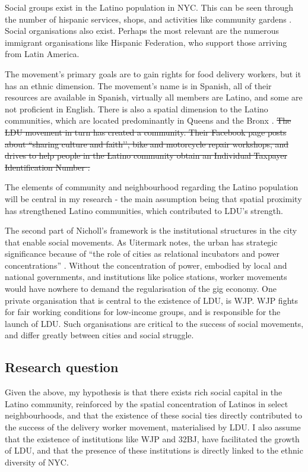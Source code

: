 \documentclass{article}[12pt]
\begin{document}
Social groups exist in the Latino population in NYC. This can be seen through the number of hispanic services, shops, and activities like community gardens \parencite{saldivar2004culturing}. Social organisations also exist. Perhaps the most relevant are the numerous immigrant organisations like Hispanic Federation, who support those arriving from Latin America. 

The movement’s primary goals are to gain rights for food delivery workers, but it has an ethnic dimension. The movement’s name is in Spanish, all of their resources are available in Spanish, virtually all members are Latino, and some are not proficient in English. There is also a spatial dimension to the Latino communities, which are located predominantly in Queens and the Bronx \parencite{nycimmigrantpopulation2021}. \sout{The LDU movement in turn has created a community. Their Facebook page posts about ``sharing culture and faith’’, bike and motorcycle repair workshops, and drives to help people in the Latino community obtain an Individual Taxpayer Identification Number \parencite{facebookldu}.}

The elements of community and neighbourhood regarding the Latino population will be central in my research - the main assumption being that spatial proximity has strengthened Latino communities, which contributed to LDU’s strength.

The second part of Nicholl's framework is the institutional structures in the city that enable social movements. As Uitermark notes, the urban has strategic significance because of ``the role of cities as relational incubators and power concentrations'' \parencite{uitermark2012cities}. Without the concentration of power, embodied by local and national governments, and institutions like police stations, worker movements would have nowhere to demand the regularisation of the gig economy. One private organisation that is central to the existence of LDU, is WJP. WJP fights for fair working conditions for low-income groups, and is responsible for the launch of LDU. Such organisations are critical to the success of social movements, and differ greatly between cities and social struggle.

\subsection{Research question}

Given the above, my hypothesis is that there exists rich social capital in the Latino community, reinforced by the spatial concentration of Latinos in select neighbourhoods, and that the existence of these social ties directly contributed to the success of the delivery worker movement, materialised by LDU. 
I also assume that the existence of institutions like WJP and 32BJ, have facilitated the growth of LDU, and that the presence of these institutions is directly linked to the ethnic diversity of NYC.
\end{document}
